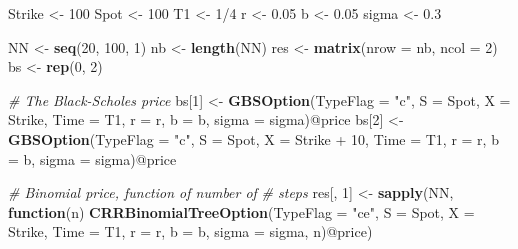 \documentclass[justified]{tufte-book}
\newenvironment{Shaded}{}{}
\newcommand{\CommentTok}[1]{\textcolor[rgb]{0.38,0.63,0.69}{\textit{#1}}}
\newcommand{\ControlFlowTok}[1]{\textcolor[rgb]{0.00,0.44,0.13}{\textbf{#1}}}
\newcommand{\DataTypeTok}[1]{\textcolor[rgb]{0.56,0.13,0.00}{#1}}
\newcommand{\DecValTok}[1]{\textcolor[rgb]{0.25,0.63,0.44}{#1}}
\newcommand{\FloatTok}[1]{\textcolor[rgb]{0.25,0.63,0.44}{#1}}
\newcommand{\KeywordTok}[1]{\textcolor[rgb]{0.00,0.44,0.13}{\textbf{#1}}}
\newcommand{\NormalTok}[1]{#1}
\newcommand{\OperatorTok}[1]{\textcolor[rgb]{0.40,0.40,0.40}{#1}}
\newcommand{\StringTok}[1]{\textcolor[rgb]{0.25,0.44,0.63}{#1}}
\begin{document}
\begin{Shaded}
\begin{Highlighting}[]
\NormalTok{Strike \textless{}{-}}\StringTok{ }\DecValTok{100}
\NormalTok{Spot \textless{}{-}}\StringTok{ }\DecValTok{100}
\NormalTok{T1 \textless{}{-}}\StringTok{ }\DecValTok{1}\OperatorTok{/}\DecValTok{4}
\NormalTok{r \textless{}{-}}\StringTok{ }\FloatTok{0.05}
\NormalTok{b \textless{}{-}}\StringTok{ }\FloatTok{0.05}
\NormalTok{sigma \textless{}{-}}\StringTok{ }\FloatTok{0.3}

\NormalTok{NN \textless{}{-}}\StringTok{ }\KeywordTok{seq}\NormalTok{(}\DecValTok{20}\NormalTok{, }\DecValTok{100}\NormalTok{, }\DecValTok{1}\NormalTok{)}
\NormalTok{nb \textless{}{-}}\StringTok{ }\KeywordTok{length}\NormalTok{(NN)}
\NormalTok{res \textless{}{-}}\StringTok{ }\KeywordTok{matrix}\NormalTok{(}\DataTypeTok{nrow =}\NormalTok{ nb, }\DataTypeTok{ncol =} \DecValTok{2}\NormalTok{)}
\NormalTok{bs \textless{}{-}}\StringTok{ }\KeywordTok{rep}\NormalTok{(}\DecValTok{0}\NormalTok{, }\DecValTok{2}\NormalTok{)}

\CommentTok{\# The Black{-}Scholes price}
\NormalTok{bs[}\DecValTok{1}\NormalTok{] \textless{}{-}}\StringTok{ }\KeywordTok{GBSOption}\NormalTok{(}\DataTypeTok{TypeFlag =} \StringTok{"c"}\NormalTok{, }\DataTypeTok{S =}\NormalTok{ Spot, }\DataTypeTok{X =}\NormalTok{ Strike,}
    \DataTypeTok{Time =}\NormalTok{ T1, }\DataTypeTok{r =}\NormalTok{ r, }\DataTypeTok{b =}\NormalTok{ b, }\DataTypeTok{sigma =}\NormalTok{ sigma)}\OperatorTok{@}\NormalTok{price}
\NormalTok{bs[}\DecValTok{2}\NormalTok{] \textless{}{-}}\StringTok{ }\KeywordTok{GBSOption}\NormalTok{(}\DataTypeTok{TypeFlag =} \StringTok{"c"}\NormalTok{, }\DataTypeTok{S =}\NormalTok{ Spot, }\DataTypeTok{X =}\NormalTok{ Strike }\OperatorTok{+}
\StringTok{    }\DecValTok{10}\NormalTok{, }\DataTypeTok{Time =}\NormalTok{ T1, }\DataTypeTok{r =}\NormalTok{ r, }\DataTypeTok{b =}\NormalTok{ b, }\DataTypeTok{sigma =}\NormalTok{ sigma)}\OperatorTok{@}\NormalTok{price}

\CommentTok{\# Binomial price, function of number of}
\CommentTok{\# steps}
\NormalTok{res[, }\DecValTok{1}\NormalTok{] \textless{}{-}}\StringTok{ }\KeywordTok{sapply}\NormalTok{(NN, }\ControlFlowTok{function}\NormalTok{(n) }\KeywordTok{CRRBinomialTreeOption}\NormalTok{(}\DataTypeTok{TypeFlag =} \StringTok{"ce"}\NormalTok{,}
    \DataTypeTok{S =}\NormalTok{ Spot, }\DataTypeTok{X =}\NormalTok{ Strike, }\DataTypeTok{Time =}\NormalTok{ T1, }\DataTypeTok{r =}\NormalTok{ r, }\DataTypeTok{b =}\NormalTok{ b,}
    \DataTypeTok{sigma =}\NormalTok{ sigma, n)}\OperatorTok{@}\NormalTok{price)}


\end{Highlighting}
\end{Shaded}
\end{document}
